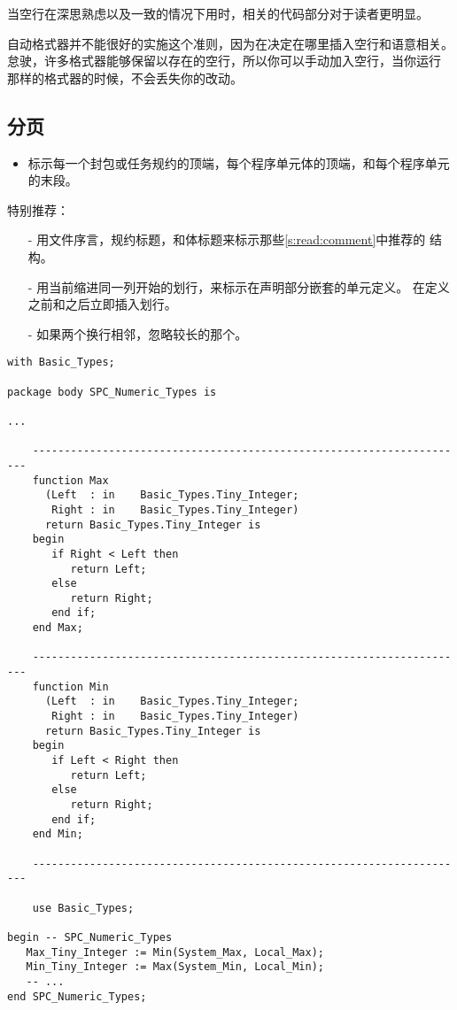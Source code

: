 \begin{blockindent}
当空行在深思熟虑以及一致的情况下用时，相关的代码部分对于读者更明显。
\end{blockindent}

\begin{blockindent}
自动格式器并不能很好的实施这个准则，因为在决定在哪里插入空行和语意相关。
怠驶，许多格式器能够保留以存在的空行，所以你可以手动加入空行，当你运行
那样的格式器的时候，不会丢失你的改动。
\end{blockindent}

\subsection{分页}
\label{c:src:code_fmt:page}
\begin{itemize}
    \item 标示每一个封包或任务规约的顶端，每个程序单元体的顶端，和每个程序单元
的末段。
\end{itemize}

\begin{blockindent}
特别推荐：
\begin{itemize}
    \item[-] 用文件序言，规约标题，和体标题来标示那些\ref{s:read:comment}中推荐的
结构。
    \item[-] 用当前缩进同一列开始的划行，来标示在声明部分嵌套的单元定义。
在定义之前和之后立即插入划行。
    \item[-] 如果两个换行相邻，忽略较长的那个。
\end{itemize}
\end{blockindent}

\begin{blockindent}
\noindent
\begin{lstlisting}
with Basic_Types;

package body SPC_Numeric_Types is

...

    ---------------------------------------------------------------------
    function Max
	  (Left  : in    Basic_Types.Tiny_Integer;
	   Right : in    Basic_Types.Tiny_Integer)
	  return Basic_Types.Tiny_Integer is
    begin
       if Right < Left then
          return Left;
       else
          return Right;
       end if;
    end Max;

    ---------------------------------------------------------------------
    function Min
	  (Left  : in    Basic_Types.Tiny_Integer;
	   Right : in    Basic_Types.Tiny_Integer)
	  return Basic_Types.Tiny_Integer is
    begin
       if Left < Right then
          return Left;
       else
          return Right;
       end if;
    end Min;

    ---------------------------------------------------------------------

    use Basic_Types;

begin -- SPC_Numeric_Types
   Max_Tiny_Integer := Min(System_Max, Local_Max);
   Min_Tiny_Integer := Max(System_Min, Local_Min);
   -- ...
end SPC_Numeric_Types;
\end{lstlisting}
\end{blockindent}

